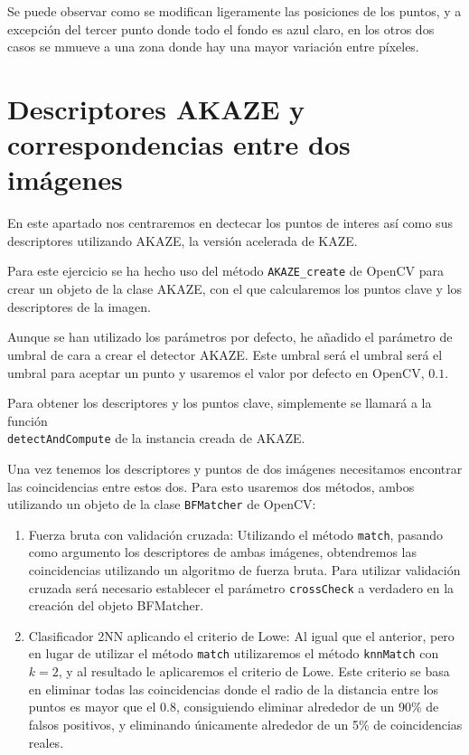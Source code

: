\documentclass[12pt, spanish]{article}
\begin{document}
Se puede observar como se modifican ligeramente las posiciones de los puntos, y a excepción del tercer punto donde todo el fondo es azul claro, en los otros dos casos se mmueve a una zona donde hay una mayor variación entre píxeles.


\section{Descriptores AKAZE y correspondencias entre dos imágenes}

En este apartado nos centraremos en dectecar los puntos de interes así como sus descriptores utilizando AKAZE\cite{akaze}, la versión acelerada de KAZE\cite{kaze}.

Para este ejercicio se ha hecho uso del método \texttt{AKAZE\_create}\cite{cAKAZE} de OpenCV para crear un objeto de la clase AKAZE, con el que calcularemos los puntos clave y los descriptores de la imagen.

Aunque se han utilizado los parámetros por defecto, he añadido el parámetro de umbral de cara a crear el detector AKAZE. Este umbral será el umbral será el umbral para aceptar un punto y usaremos el valor por defecto en OpenCV, $0.1$.

Para obtener los descriptores y los puntos clave, simplemente se llamará a la función\\ \texttt{detectAndCompute}\cite{detectCompute} de la instancia creada de AKAZE.


Una vez tenemos los descriptores y puntos de dos imágenes necesitamos encontrar las coincidencias entre estos dos. Para esto usaremos dos métodos, ambos utilizando un objeto de la clase \texttt{BFMatcher}\cite{BFMatcher} de OpenCV:

\begin{enumerate}
	\item Fuerza bruta con validación cruzada: Utilizando el método \texttt{match}\cite{match}, pasando como argumento los descriptores de ambas imágenes, obtendremos las coincidencias utilizando un algoritmo de fuerza bruta. Para utilizar validación cruzada será necesario establecer el parámetro \texttt{crossCheck} a verdadero en la creación del objeto BFMatcher.
	\item Clasificador 2NN aplicando el criterio de Lowe: Al igual que el anterior, pero en lugar de utilizar el método \texttt{match} utilizaremos el método \texttt{knnMatch}\cite{knnMatch} con $k = 2$, y al resultado le aplicaremos el criterio de Lowe. Este criterio se basa en eliminar todas las coincidencias donde el radio de la distancia entre los puntos es mayor que el $0.8$, consiguiendo eliminar alrededor de un 90\% de falsos positivos, y eliminando únicamente alrededor de un 5\% de coincidencias reales\cite{lowe}.
\end{enumerate}
\end{document}
